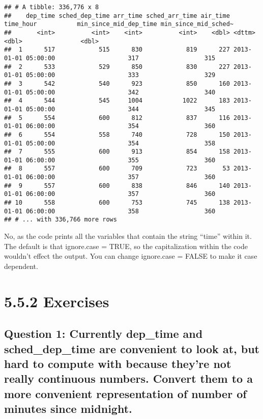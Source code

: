\documentclass[
]{book}
\begin{document}
\begin{verbatim}
## # A tibble: 336,776 x 8
##    dep_time sched_dep_time arr_time sched_arr_time air_time time_hour           min_since_mid_dep_time min_since_mid_sched~
##       <int>          <int>    <int>          <int>    <dbl> <dttm>                               <dbl>                <dbl>
##  1      517            515      830            819      227 2013-01-01 05:00:00                    317                  315
##  2      533            529      850            830      227 2013-01-01 05:00:00                    333                  329
##  3      542            540      923            850      160 2013-01-01 05:00:00                    342                  340
##  4      544            545     1004           1022      183 2013-01-01 05:00:00                    344                  345
##  5      554            600      812            837      116 2013-01-01 06:00:00                    354                  360
##  6      554            558      740            728      150 2013-01-01 05:00:00                    354                  358
##  7      555            600      913            854      158 2013-01-01 06:00:00                    355                  360
##  8      557            600      709            723       53 2013-01-01 06:00:00                    357                  360
##  9      557            600      838            846      140 2013-01-01 06:00:00                    357                  360
## 10      558            600      753            745      138 2013-01-01 06:00:00                    358                  360
## # ... with 336,766 more rows
\end{verbatim}

No, as the code prints all the variables that contain the string ``time'' within it. The default is that ignore.case = TRUE, so the capitalization within the code wouldn't effect the output. You can change ignore.case = FALSE to make it case dependent.

\hypertarget{exercises}{%
\section{5.5.2 Exercises}\label{exercises}}

\hypertarget{question-1-currently-dep_time-and-sched_dep_time-are-convenient-to-look-at-but-hard-to-compute-with-because-theyre-not-really-continuous-numbers.-convert-them-to-a-more-convenient-representation-of-number-of-minutes-since-midnight.}{%
\subsection{Question 1: Currently dep\_time and sched\_dep\_time are convenient to look at, but hard to compute with because they're not really continuous numbers. Convert them to a more convenient representation of number of minutes since midnight.}\label{question-1-currently-dep_time-and-sched_dep_time-are-convenient-to-look-at-but-hard-to-compute-with-because-theyre-not-really-continuous-numbers.-convert-them-to-a-more-convenient-representation-of-number-of-minutes-since-midnight.}}
\end{document}
